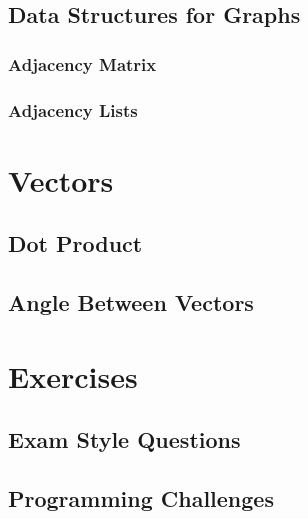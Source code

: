 	\subsection{Data Structures for Graphs}
	
		\subsubsection{Adjacency Matrix}
		
		\subsubsection{Adjacency Lists}


\section{Vectors}

	\subsection{Dot Product}
	
	\subsection{Angle Between Vectors}
	
\section{Exercises}
\subsection{Exam Style Questions}

\subsection{Programming Challenges}
%
%

